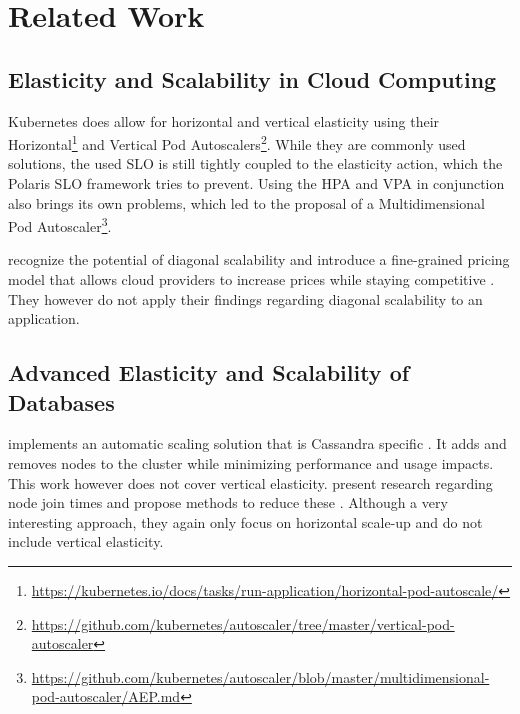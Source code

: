 \chapter{Related Work}
\label{ch:related-work}

\section{Elasticity and Scalability in Cloud Computing}

Kubernetes does allow for horizontal and vertical elasticity using their Horizontal\footnote{\raggedright\url{https://kubernetes.io/docs/tasks/run-application/horizontal-pod-autoscale/}} and Vertical Pod Autoscalers\footnote{\raggedright\url{https://github.com/kubernetes/autoscaler/tree/master/vertical-pod-autoscaler}}. While they are commonly used solutions, the used SLO is still tightly coupled to the elasticity action, which the Polaris SLO framework tries to prevent. Using the HPA and VPA in conjunction also brings its own problems, which led to the proposal of a Multidimensional Pod Autoscaler\footnote{\raggedright\url{https://github.com/kubernetes/autoscaler/blob/master/multidimensional-pod-autoscaler/AEP.md}}.

\citeauthor{laubisCloudAdoptionFineGrained2016} recognize the potential of diagonal scalability and introduce a fine-grained pricing model that allows cloud providers to increase prices while staying competitive \cite{laubisCloudAdoptionFineGrained2016}. They however do not apply their findings regarding diagonal scalability to an application.

\section{Advanced Elasticity and Scalability of Databases}

\citeauthor{baakindAutomaticScalingCassandra2013} implements an automatic scaling solution that is Cassandra specific \cite{baakindAutomaticScalingCassandra2013}. It adds and removes nodes to the cluster while minimizing performance and usage impacts. This work however does not cover vertical elasticity. \citeauthor{miyokawaElasticityImprovementCassandra2016a} present research regarding node join times and propose methods to reduce these \cite{miyokawaElasticityImprovementCassandra2016a}. Although a very interesting approach, they again only focus on horizontal scale-up and do not include vertical elasticity.

